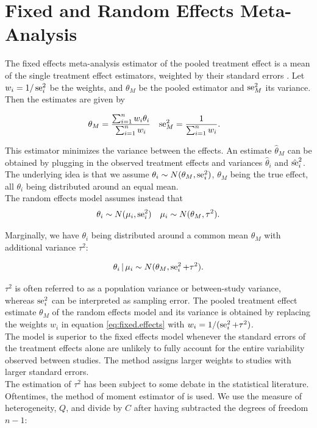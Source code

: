 \documentclass[11pt,a4paper,twoside]{book}\usepackage[]{graphicx}\usepackage[]{color}
\begin{document}
\section{Fixed and Random Effects Meta-Analysis} \label{sec:meta.analysis}
The fixed effects meta-analysis estimator of the pooled treatment effect is a mean of the single treatment effect estimators, weighted by their standard errors \citep{fixed.effects.rosenthal}. Let $w_i = 1/\operatorname{se}_i^2$ be the weights, and $\theta_M$ be the pooled estimator and $\operatorname{se}_M^2$ its variance. Then the estimates are given by

\begin{align}
\theta_M &= \frac{\sum_{i = 1}^n w_i \theta_i}{\sum_{i = 1}^n w_i} &
\operatorname{se}_M^2 &= \frac{1}{\sum_{i = 1}^n w_i}. \label{eq:fixed.effects}
\end{align}

This estimator minimizes the variance between the effects. An estimate $\hat{\theta}_M$ can be obtained by plugging in the observed treatment effects and variances $\hat{\theta}_i$ and $\hat{\operatorname{se}}_i^2$. The underlying idea is that we assume $\theta_i \sim N(\theta_M, \operatorname{se}_i^2)$, $\theta_M$ being the true effect, all $\theta_i$ being distributed around an equal mean.\\
The random effects model \citep{whitehead} assumes instead that 
\begin{align}
\theta_i \sim N(\mu_i, \operatorname{se}_i^2) &&
\mu_i \sim N(\theta_M, \tau^2). \label{eq:random.effects} 
\end{align}

Marginally, we have $\theta_i$ being distributed around a common mean $\theta_M$ with additional variance $\tau^2$:

\begin{align}
\theta_i \given \mu_i \sim N(\theta_M, \se_i^2 + \tau^2). \nonumber %
\end{align}

$\tau^2$ is often referred to as a population variance or between-study variance, whereas $\operatorname{se}_i^2$ can be interpreted as sampling error. The pooled treatment effect estimate $\theta_M$ of the random effects model and its variance is obtained by replacing the weights $w_i$ in equation \eqref{eq:fixed.effects} with $w_i = 1/(\operatorname{se}_i^2 + \tau^2)$.\\
The model is superior to the fixed effects model whenever the standard errors of the treatment effects alone are unlikely to fully account for the entire variability observed between studies. The method assigns larger weights to studies with larger standard errors.\\
The estimation of $\tau^2$ has been subject to some debate in the statistical literature. Oftentimes, the method of moment estimator of \citet{tau.estimator} is used. We use the measure of heterogeneity, $Q$, and divide by $C$ after having subtracted the degrees of freedom $n-1$:
\end{document}
